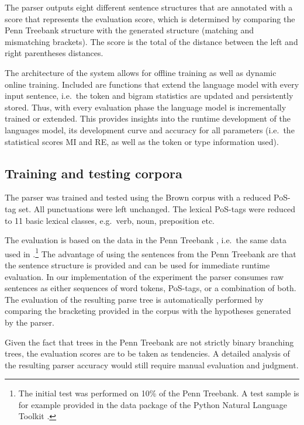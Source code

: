 \documentclass[11pt,a4paper,english]{article}
\begin{document}
The parser outputs eight different sentence structures that are annotated with a score that represents the evaluation score, which is determined by comparing the Penn Treebank structure with the generated structure (matching and mismatching brackets). The score is the total of the distance between the left and right parentheses distances.

The architecture of the system allows for offline training as well as dynamic online training. Included are functions that extend the language model with every input sentence, i.e.\ the token and bigram statistics are updated and persistently stored. Thus, with every evaluation phase the language model is incrementally trained or extended. This provides insights into the runtime development of the languages model, its development curve and accuracy for all parameters (i.e.\ the statistical scores MI and RE, as well as the token or type information used).


\subsection{Training and testing corpora}

The parser was trained and tested using the Brown corpus \citep{Francis:Kucera:1982} with a reduced PoS-tag set. All punctuations were left unchanged. The lexical PoS-tags were reduced to 11 basic lexical classes, e.g.\ verb, noun, preposition etc.

The evaluation is based on the data in the Penn Treebank \citep{Marcus:ea:1993}, i.e.\ the same data used in \cite{Magerman:Marcus:1990}.\footnote{The initial test was performed on 10\% of the Penn Treebank. A test sample is for example provided in the data package of the Python Natural Language Toolkit \citep{Bird:ea:2009}.} The advantage of using the sentences from the Penn Treebank are that the sentence structure is provided and can be used for immediate runtime evaluation. In our implementation of the experiment the parser consumes raw sentences as either sequences of word tokens, PoS-tags, or a combination of both. The evaluation of the resulting parse tree is automatically performed by comparing the bracketing provided in the corpus with the hypotheses generated by the parser.

Given the fact that trees in the Penn Treebank are not strictly binary branching trees, the evaluation scores are to be taken as tendencies. A detailed analysis of the resulting parser accuracy would still require manual evaluation and judgment.
\end{document}
